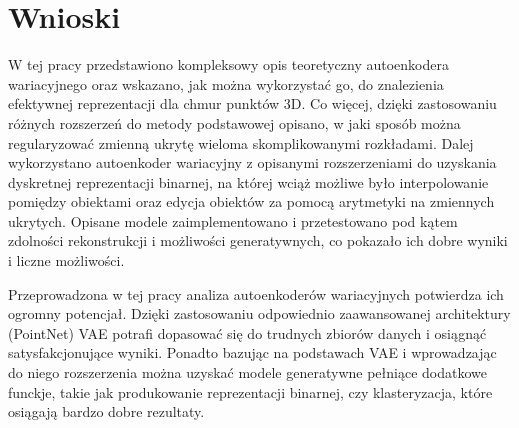 \documentclass{iithesis}
\begin{document}
\chapter{Wnioski}
W tej pracy przedstawiono kompleksowy opis teoretyczny autoenkodera wariacyjnego
oraz wskazano, jak można wykorzystać go, do znalezienia efektywnej reprezentacji dla
chmur punktów 3D. Co więcej, dzięki zastosowaniu różnych rozszerzeń do metody podstawowej
opisano, w jaki sposób można regularyzować zmienną ukrytę wieloma skomplikowanymi rozkładami.
Dalej wykorzystano autoenkoder wariacyjny z opisanymi rozszerzeniami do uzyskania dyskretnej
reprezentacji binarnej, na której wciąż możliwe było interpolowanie pomiędzy obiektami
oraz edycja obiektów za pomocą arytmetyki na zmiennych ukrytych.
Opisane modele zaimplementowano i przetestowano pod kątem zdolności rekonstrukcji i możliwości
generatywnych, co pokazało ich dobre wyniki i liczne możliwości.

Przeprowadzona w tej pracy analiza autoenkoderów wariacyjnych potwierdza ich ogromny potencjał.
Dzięki zastosowaniu odpowiednio zaawansowanej architektury (PointNet) VAE potrafi dopasować
się do trudnych zbiorów danych i osiągnąć satysfakcjonujące wyniki.
Ponadto bazując na podstawach VAE i wprowadzając do niego rozszerzenia można uzyskać
modele generatywne pełniące dodatkowe funckje, takie jak produkowanie reprezentacji binarnej,
czy klasteryzacja, które osiągają bardzo dobre rezultaty.

\clearpage



\end{document}
